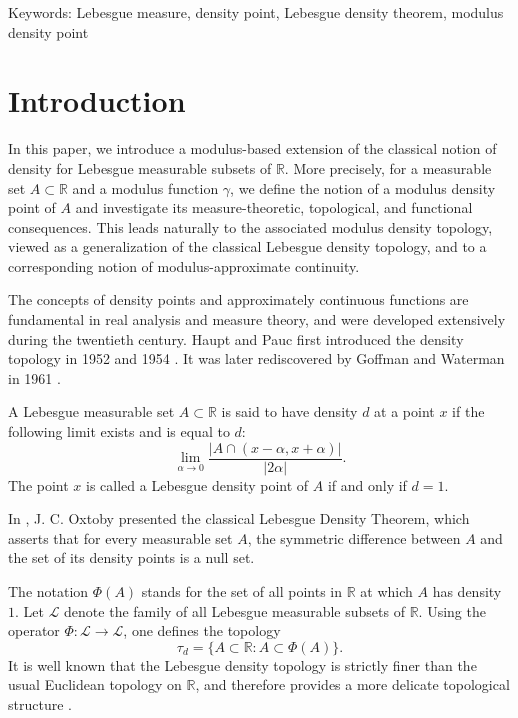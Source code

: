 \documentclass{amsart}
\theoremstyle{plain}
\numberwithin{equation}{section}
\begin{document}
\maketitle
  Keywords: Lebesgue measure, density point, Lebesgue density theorem, modulus density point

\section{Introduction}
\label{Sec:1}
In this paper, we introduce a modulus-based extension of the classical notion of density for Lebesgue measurable subsets of $\mathbb{R}$. More precisely, for a measurable set $A\subset \mathbb{R}$ and a modulus function $\gamma$, we define the notion of a modulus density point of $A$ and investigate its measure-theoretic, topological, and functional consequences. This leads naturally to the associated modulus density topology, viewed as a generalization of the classical Lebesgue density topology, and to a corresponding notion of modulus-approximate continuity.

The concepts of density points and approximately continuous functions are fundamental in real analysis and measure theory, and were developed extensively during the twentieth century. Haupt and Pauc first introduced the density topology in 1952 and 1954 \cite{ hp1, hp2}. It was later rediscovered by Goffman and Waterman in 1961 \cite{cgcntnd}.  

A Lebesgue measurable set $A\subset \mathbb{R}$ is said to have density $d$ at a point $x$ if the following limit exists and is equal to $d$:
$$\lim_{\alpha \to 0}\frac{|A\cap (x-\alpha,x+\alpha)|}{|2\alpha|}.$$
The point $x$ is called a Lebesgue density point of $A$ if and only if $d=1$. 

In \cite{jcom}, J. C. Oxtoby presented the classical Lebesgue Density Theorem, which asserts that for every measurable set $A$, the symmetric difference between $A$ and the set of its density points is a null set.

The notation $\Phi(A)$ stands for the set of all points in $\mathbb{R}$ at which $A$ has density $1$. Let $\mathcal{L}$ denote the family of all Lebesgue measurable subsets of $\mathbb{R}$. Using the operator $\Phi: \mathcal{L} \to \mathcal{L}$, one defines the topology
$$\tau_d=\{A\subset \mathbb{R}: A\subset \Phi(A)\}.$$
It is well known that the Lebesgue density topology is strictly finer than the usual Euclidean topology on $\mathbb{R}$, and therefore provides a more delicate topological structure \cite{wh}.
\end{document}
